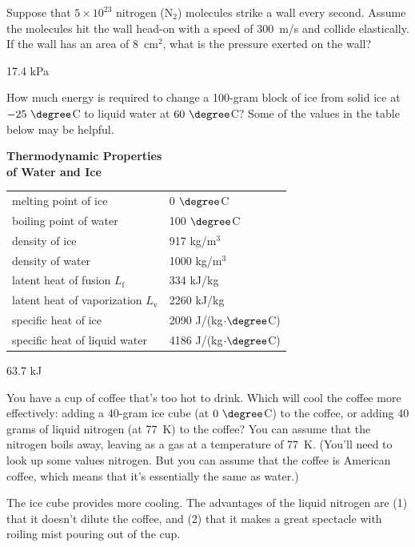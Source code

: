 \begin{Exercise}
Suppose that $5\times10^{23}$ nitrogen (N$_2$) molecules strike a wall every second.  Assume the molecules hit the wall head-on with a speed of 300~m/s and collide elastically.  If the wall has an area of 8~cm$^2$, what is the pressure exerted on the wall? 
\end{Exercise}
\begin{Answer}
17.4 kPa
\end{Answer}


\begin{Exercise}
How much energy is required to change a 100-gram block of ice from solid ice at $-25~\degree$C to liquid water at $60~\degree$C?  Some of the values in the table below may be helpful.

\begin{center}
\textbf{Thermodynamic Properties \\ of Water and Ice} \\
\begin{tabular}{l l}
\hline
melting point of ice & 0$~\degree$C \\
boiling point of water & 100$~\degree$C \\
density of ice & 917 kg/m$^3$ \\
density of water & 1000 kg/m$^3$ \\
latent heat of fusion $L_\text{f}$ & 334 kJ/kg \\
latent heat of vaporization $L_\text{v}$ & 2260 kJ/kg \\
specific heat of ice & 2090 J/(kg$\cdot \degree$C) \\
specific heat of liquid water & 4186 J/(kg$\cdot \degree$C)
\end{tabular}
\end{center}
\end{Exercise}
\begin{Answer}
63.7 kJ
\end{Answer}


\begin{Exercise}
You have a cup of coffee that's too hot to drink.  Which will cool the coffee more effectively: adding a 40-gram ice cube (at $0~\degree$C) to the coffee, or adding 40 grams of liquid nitrogen (at 77~K) to the coffee?  You can assume that the nitrogen boils away, leaving as a gas at a temperature of 77~K.  (You'll need to look up some values nitrogen. But you can assume that the coffee is American coffee, which means that it's essentially the same as water.)
\end{Exercise}
\begin{Answer}
The ice cube provides more cooling.  The advantages of the liquid nitrogen are (1) that it doesn't dilute the coffee, and (2) that it makes a great spectacle with roiling mist pouring out of the cup. 
\end{Answer}


